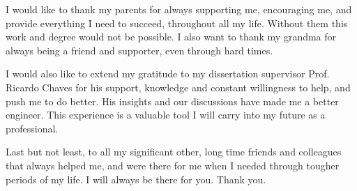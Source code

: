 
I would like to thank my parents for always supporting me, encouraging me, and provide everything I need to succeed, throughout all my life. Without them this work and degree would not be possible. I also want to thank my grandma for always being a friend and supporter, even through hard times.

I would also like to extend my gratitude to my dissertation supervisor Prof. Ricardo Chaves for his support, knowledge and constant willingness to help, and push me to do better. His insights and our discussions have made me a better engineer. This experience is a valuable tool I will carry into my future as a professional.

Last but not least, to all my significant other, long time friends and colleagues that always helped me, and were there for me when I needed through tougher periods of my life. I will always be there for you. Thank you.






